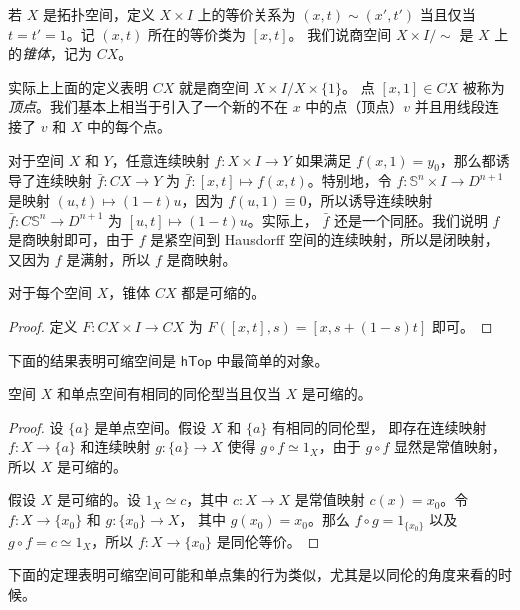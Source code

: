 \documentclass[fontset=none]{Notes}
\newcommand{\cat}[1]{\mathsf{#1}}
\begin{document}
\begin{definition}
  若 $X$ 是拓扑空间，定义 $X\times I$ 上的等价关系为 $(x,t)\sim (x',t')$
  当且仅当 $t=t'=1$。记 $(x,t)$ 所在的等价类为 $[x,t]$。
  我们说商空间 $X\times I/\sim$ 是 $X$ 上的\emph{锥体}，记为 $CX$。
\end{definition}

实际上上面的定义表明 $CX$ 就是商空间 $X\times I/X\times\{1\}$。
点 $[x,1]\in CX$ 被称为\emph{顶点}。我们基本上相当于引入了一个新的不在
$x$ 中的点（顶点）$v$ 并且用线段连接了 $v$ 和 $X$ 中的每个点。

\begin{example}
  对于空间 $X$ 和 $Y$，任意连续映射 $f:X\times I\to Y$
  如果满足 $f(x,1)=y_0$，那么都诱导了连续映射 $\bar f:CX\to Y$
  为 $\bar f:[x,t]\mapsto f(x,t)$。特别地，令 $f:\mathbb{S}^{n}\times I\to D^{n+1}$
  是映射 $(u,t)\mapsto (1-t)u$，因为 $f(u,1)\equiv 0$，所以诱导连续映射
  $\bar f:C \mathbb{S}^n\to D^{n+1}$ 为 $[u,t]\mapsto (1-t)u$。实际上，
  $\bar f$ 还是一个同胚。我们说明 $f$ 是商映射即可，由于 $f$
  是紧空间到 Hausdorff 空间的连续映射，所以是闭映射，又因为 $f$
  是满射，所以 $f$ 是商映射。
\end{example}

\begin{theorem}
  对于每个空间 $X$，锥体 $CX$ 都是可缩的。
\end{theorem}
\begin{proof}
  定义 $F:CX\times I\to CX$ 为
  $F([x,t],s)=[x,s+(1-s)t]$ 即可。
\end{proof}

下面的结果表明可缩空间是 $\cat{hTop}$ 中最简单的对象。

\begin{theorem}
  空间 $X$ 和单点空间有相同的同伦型当且仅当 $X$ 是可缩的。
\end{theorem}
\begin{proof}
  设 $\{a\}$ 是单点空间。假设 $X$ 和 $\{a\}$ 有相同的同伦型，
  即存在连续映射 $f:X\to\{a\}$ 和连续映射 $g:\{a\}\to X$
  使得 $g\circ f\simeq 1_X$，由于 $g\circ f$ 显然是常值映射，
  所以 $X$ 是可缩的。

  假设 $X$ 是可缩的。设 $1_X\simeq c$，其中 $c:X\to X$ 是常值映射
  $c(x)=x_0$。令 $f:X\to \{x_0\}$ 和 $g:\{x_0\}\to X$，
  其中 $g(x_0)=x_0$。那么 $f\circ g=1_{\{x_0\}}$ 以及
  $g\circ f=c\simeq 1_X$，所以 $f:X\to \{x_0\}$ 是同伦等价。
\end{proof}

下面的定理表明可缩空间可能和单点集的行为类似，尤其是以同伦的角度来看的时候。
\end{document}

